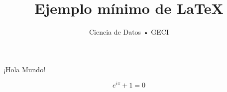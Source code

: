 \documentclass{article}
\begin{document}
\title{Ejemplo mínimo de \LaTeX}
\author{Ciencia de Datos • GECI}
\maketitle

¡Hola Mundo!

$$ e^{i\pi} + 1 = 0 $$
\end{document}
